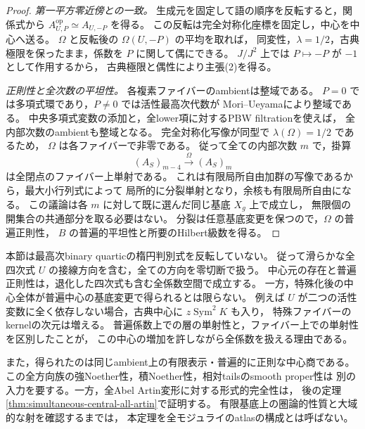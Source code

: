 \begin{proof}
\emph{第一平方零近傍との一致。}
生成元を固定して語の順序を反転すると，関係式から
$A_{U,P}^{\mathrm{op}}\simeq A_{U,-P}$ を得る。
この反転は完全対称化座標を固定し，中心を中心へ送る。
$\Omega$ と反転後の $\Omega(U,-P)$ の平均を取れば，
同変性，$\lambda=1/2$，古典極限を保ったまま，係数を $P$ に関して偶にできる。
$J/J^2$ 上では $P\mapsto-P$ が $-1$ として作用するから，
古典極限と偶性により主張(2)を得る。

\emph{正則性と全次数の平坦性。}
各複素ファイバーのambientは整域である。
$P=0$ では多項式環であり，$P\ne0$ では活性最高次代数が
Mori--Ueyama\cite[Corollary~3.8]{MoriUeyama2019}により整域である。
中央多項式変数の添加と，全lower項に対するPBW filtrationを使えば，
全内部次数のambientも整域となる。
完全対称化写像が同型で $\lambda(\Omega)=1/2$ であるため，
$\Omega$ は各ファイバーで非零である。
従って全ての内部次数 $m$ で，掛算
\[
 (A_S)_{m-4}\xrightarrow{\ \Omega\ }(A_S)_m
\]
は全閉点のファイバー上単射である。
これは有限局所自由加群の写像であるから，最大小行列式によって
局所的に分裂単射となり，余核も有限局所自由になる。
この議論は各 $m$ に対して既に選んだ同じ基底 $X_g$ 上で成立し，
無限個の開集合の共通部分を取る必要はない。
分裂は任意基底変更を保つので，$\Omega$ の普遍正則性，
$B$ の普遍的平坦性と所要のHilbert級数を得る。
\end{proof}

\begin{remark}[適用範囲と残る圏論的問題]
本節は最高次binary quarticの楕円判別式を反転していない。
従って滑らかな全四次式 $U$ の接線方向を含む，全ての方向を零切断で扱う。
中心元の存在と普遍正則性は，退化した四次式も含む全係数空間で成立する。
一方，特殊化後の中心全体が普遍中心の基底変更で得られるとは限らない。
例えば $U$ が二つの活性変数に全く依存しない場合，古典中心に
$z\operatorname{Sym}^2K$ も入り，
特殊ファイバーのkernelの次元は増える。
普遍係数上での層の単射性と，ファイバー上での単射性を区別したことが，
この中心の増加を許しながら全係数を扱える理由である。

また，得られたのは同じambient上の有限表示・普遍的に正則な中心商である。
この全方向族の強Noether性，積Noether性，相対tailsのsmooth proper性は
別の入力を要する。一方，全Abel Artin変形に対する形式的完全性は，
後の定理\ref{thm:simultaneous-central-all-artin}で証明する。
有限基底上の圏論的性質と大域的な射を確認するまでは，
本定理を全モジュライのatlasの構成とは呼ばない。
\end{remark}
